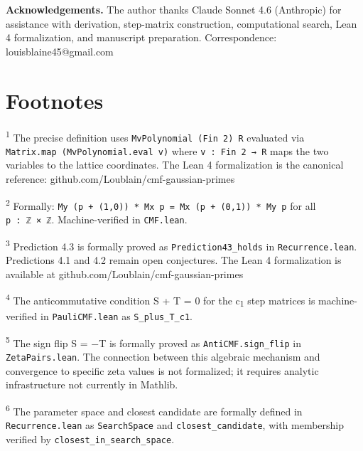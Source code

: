 \documentclass[11pt]{article}
\begin{document}
\textbf{Acknowledgements.} The author thanks Claude Sonnet 4.6
(Anthropic) for assistance with derivation, step-matrix construction,
computational search, Lean 4 formalization, and manuscript preparation.
Correspondence: louisblaine45@gmail.com

\hypertarget{footnotes}{%
\section{Footnotes}\label{footnotes}}

\textsuperscript{1} The precise definition uses
\texttt{MvPolynomial\ (Fin\ 2)\ R} evaluated via
\texttt{Matrix.map\ (MvPolynomial.eval\ v)} where
\texttt{v\ :\ Fin\ 2\ →\ R} maps the two variables to the lattice
coordinates. The Lean 4 formalization is the canonical reference:
github.com/Loublain/cmf-gaussian-primes

\textsuperscript{2} Formally:
\texttt{My\ (p\ +\ (1,0))\ *\ Mx\ p\ =\ Mx\ (p\ +\ (0,1))\ *\ My\ p} for
all \texttt{p\ :\ ℤ\ ×\ ℤ}. Machine-verified in \texttt{CMF.lean}.

\textsuperscript{3} Prediction 4.3 is formally proved as
\texttt{Prediction43\_holds} in \texttt{Recurrence.lean}. Predictions
4.1 and 4.2 remain open conjectures. The Lean 4 formalization is
available at github.com/Loublain/cmf-gaussian-primes

\textsuperscript{4} The anticommutative condition S + T = 0 for the
c\textsubscript{1} step matrices is machine-verified in
\texttt{PauliCMF.lean} as \texttt{S\_plus\_T\_c1}.

\textsuperscript{5} The sign flip S = −T is formally proved as
\texttt{AntiCMF.sign\_flip} in \texttt{ZetaPairs.lean}. The connection
between this algebraic mechanism and convergence to specific zeta values
is not formalized; it requires analytic infrastructure not currently in
Mathlib.

\textsuperscript{6} The parameter space and closest candidate are
formally defined in \texttt{Recurrence.lean} as \texttt{SearchSpace} and
\texttt{closest\_candidate}, with membership verified by
\texttt{closest\_in\_search\_space}.
\end{document}
